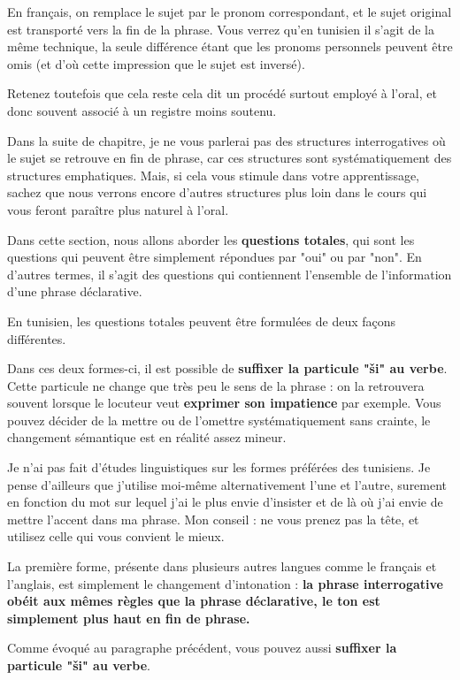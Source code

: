 En français, on remplace le sujet par le pronom correspondant, et le sujet original est transporté vers la fin de la phrase. Vous verrez qu'en tunisien il s'agit de la même technique, la seule différence étant que les pronoms personnels peuvent être omis (et d'où cette impression que le sujet est inversé).

Retenez toutefois que cela reste cela dit un procédé surtout employé à l'oral, et donc souvent associé à un registre moins soutenu.

Dans la suite de chapitre, je ne vous parlerai pas des structures interrogatives où le sujet se retrouve en fin de phrase, car ces structures sont systématiquement des structures emphatiques. Mais, si cela vous stimule dans votre apprentissage, sachez que nous verrons encore d'autres structures plus loin dans le cours qui vous feront paraître plus naturel à l'oral.

Dans cette section, nous allons aborder les \textbf{questions totales}, qui sont les questions qui peuvent être simplement répondues par "oui" ou par "non". En d'autres termes, il s'agit des questions qui contiennent l'ensemble de l'information d'une phrase déclarative.

En tunisien, les questions totales peuvent être formulées de deux façons différentes.

Dans ces deux formes-ci, il est possible de \textbf{suffixer la particule "\v{s}i" au verbe}. Cette particule ne change que très peu le sens de la phrase : on la retrouvera souvent lorsque le locuteur veut \textbf{exprimer son impatience} par exemple. Vous pouvez décider de la mettre ou de l'omettre systématiquement sans crainte, le changement sémantique est en réalité assez mineur.

Je n'ai pas fait d'études linguistiques sur les formes préférées des tunisiens. Je pense d'ailleurs que j'utilise moi-même alternativement l'une et l'autre, surement en fonction du mot sur lequel j'ai le plus envie d'insister et de là où j'ai envie de mettre l'accent dans ma phrase. Mon conseil : ne vous prenez pas la tête, et utilisez celle qui vous convient le mieux.

La première forme, présente dans plusieurs autres langues comme le français et l'anglais, est simplement le changement d'intonation : \textbf{la phrase interrogative obéit aux mêmes règles que la phrase déclarative, le ton est simplement plus haut en fin de phrase.}

Comme évoqué au paragraphe précédent, vous pouvez aussi \textbf{suffixer la particule "\v{s}i" au verbe}.

